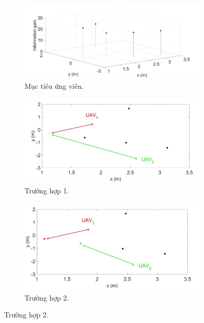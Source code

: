 \documentclass[11pt,openany]{book}
\begin{document}
\begin{figure}[H]
    \centering
    \begin{subfigure}[H]{0.6\linewidth}
        \includegraphics[width=\linewidth]{assets/3_17_a.png}
        \caption{{Mục tiêu ứng viên.}}
        \label{fig:3.17a}
    \end{subfigure}
    \begin{subfigure}[H]{0.6\linewidth}
        \includegraphics[width=\linewidth]{assets/3_17_b.png}
        \caption{{Trường hợp 1.}}
        \label{fig:3.17b}
    \end{subfigure}
    \begin{subfigure}[H]{0.6\linewidth}
        \includegraphics[width=\linewidth]{assets/3_17_c.png}
        \caption{{Trường hợp 2.}}

\end{subfigure}
\end{figure}
\end{document}
